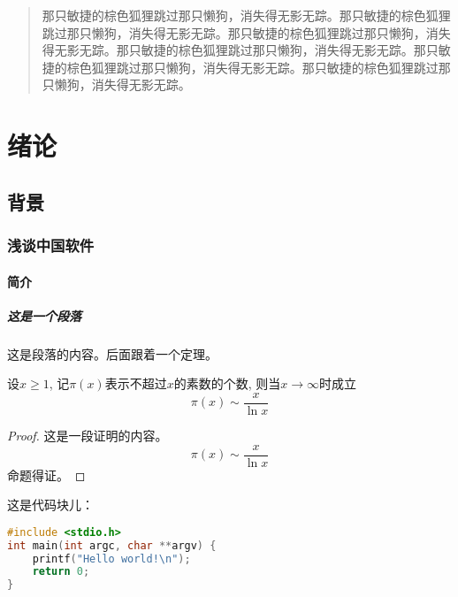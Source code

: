 \documentclass{ecnuthesis}
\begin{document}
\frontmatter

\begin{abstract}
  那只敏捷的棕色狐狸跳过那只懒狗，消失得无影无踪。那只敏捷的棕色狐狸跳过那只懒狗，消失得无影无踪。那只敏捷的棕色狐狸跳过那只懒狗，消失得无影无踪。那只敏捷的棕色狐狸跳过那只懒狗，消失得无影无踪。那只敏捷的棕色狐狸跳过那只懒狗，消失得无影无踪。那只敏捷的棕色狐狸跳过那只懒狗，消失得无影无踪。
\end{abstract}

\begin{abstractEN}
  \blindtext
\end{abstractEN}

\mainmatter

\chapter{绪论}
\section{背景}
\subsection{浅谈中国软件}
\subsubsection{简介}

\blindtext

\paragraph{这是一个段落}

这是段落的内容。后面跟着一个定理。

\begin{theorem}[素数定理]
  设$x \geqslant 1$, 记$\pi(x)$表示不超过$x$的素数的个数, 则当$x \to \infty$时成立
  \[\pi(x) \sim \frac{x}{\ln x}\]
\end{theorem}

\begin{proof}
  这是一段证明的内容。
  \[\pi(x) \sim \frac{x}{\ln x}\]
  命题得证。
\end{proof}

这是代码块儿：

\begin{lstlisting}[language=C++]
#include <stdio.h>
int main(int argc, char **argv) {
    printf("Hello world!\n");
    return 0;
}
\end{lstlisting}
\end{document}
